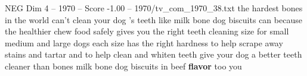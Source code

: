 \begin{textsample}{NEG Dim 4 – 1970 – Score -1.00 – 1970/tv\_com\_1970\_38.txt}  \label{ex:f4_neg_057}
the hardest bones in the world can't clean your dog 's teeth like milk bone dog biscuits can because the healthier chew food safely gives you the right teeth cleaning size for small medium and large dogs each size has the right hardness to help scrape away stains and tartar and to help clean and whiten teeth give your dog a better teeth cleaner than bones milk bone dog biscuits in beef \textbf{flavor} too you

\end{textsample}
